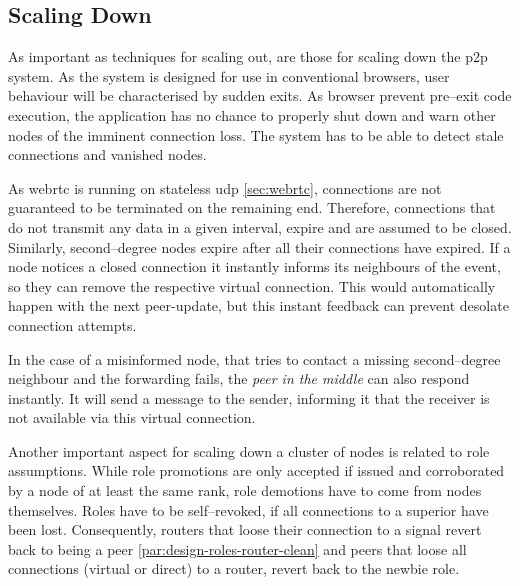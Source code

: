 \subsection{Scaling Down}
As important as techniques for scaling out, are those for scaling down the \gls{p2p} system. As the system is designed for use in conventional browsers, user behaviour will be characterised by sudden exits. As browser prevent pre–exit code execution, the application has no chance to properly shut down and warn other nodes of the imminent connection loss. The system has to be able to detect stale connections and vanished nodes.

As \gls{webrtc} is running on stateless \gls{udp} \cref{sec:webrtc}, connections are not guaranteed to be terminated on the remaining end.
Therefore, connections that do not transmit any data in a given interval, expire and are assumed to be closed. Similarly, second–degree nodes expire after all their connections have expired.
If a node notices a closed connection it instantly informs its neighbours of the event, so they can remove the respective virtual connection. This would automatically happen with the next \gls{peer-update}, but this instant feedback can prevent desolate connection attempts.

In the case of a misinformed node, that tries to contact a missing second–degree neighbour and the forwarding fails, the \textit{peer in the middle} can also respond instantly. It will send a message to the sender, informing it that the receiver is not available via this virtual connection.

Another important aspect for scaling down a cluster of nodes is related to role assumptions. While role promotions are only accepted if issued and corroborated by a node of at least the same rank, role demotions have to come from nodes themselves.
Roles have to be self–revoked, if all connections to a superior have been lost. Consequently, routers that loose their connection to a signal revert back to being a peer \cref{par:design-roles-router-clean} and peers that loose all connections (virtual or direct) to a router, revert back to the newbie role.
